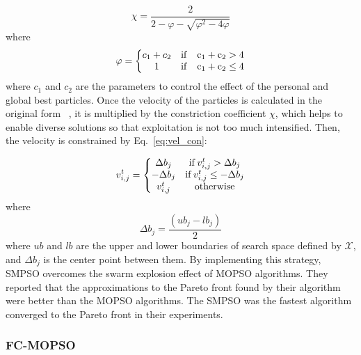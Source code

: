 \begin{equation} \label{eq:con_coe}
\chi = \frac{2}{2 -\varphi - \sqrt{\varphi^2 -4\varphi}}
\end{equation}
\noindent where
\begin{equation}
\varphi = \left\{ \begin{matrix}
    c_1 + c_2 & \rm{if} \quad c_1 +c_2 > 4 \\ 
    1 & \rm{if} \quad c_1 +c_2 \leq 4
\end{matrix} \right.
\end{equation}
\noindent where $c_1$ and $c_2$ are the parameters to control the effect of the personal and global best particles.
Once the velocity of the particles is calculated in the original form ~\cite{nebro2009smpso}, it is multiplied by the constriction coefficient $\chi$, which helps to enable diverse solutions so that exploitation is not too much intensified. Then,
the velocity is constrained by Eq.~\ref{eq:vel_con}: 

\begin{equation} \label{eq:vel_con}
v_{i, j}^t = \left\{ \begin{matrix}
    \Delta b_j & {\rm if} \, v_{i,j}^t > \Delta b_j\\
    -\Delta b_j & {\rm if} \, v_{i,j}^t \leq -\Delta b_j\\
    v_{i,j}^t & {\rm otherwise}
\end{matrix} \right.
\end{equation}
\noindent where
\begin{equation}
    \Delta b_j = \frac{(ub_j -lb_j)}{2}
\end{equation}
\noindent where $ub$ and $lb$ are the upper and lower boundaries of search space defined by $\mathcal{X}$, and $\Delta b_j$ is the center point between them.
By implementing this strategy, SMPSO overcomes the swarm explosion effect of MOPSO algorithms. 
They reported that the approximations to the Pareto front found by their algorithm were better than the MOPSO algorithms. The SMPSO was the fastest algorithm converged to the Pareto front in their experiments.

\subsubsection{FC-MOPSO}

